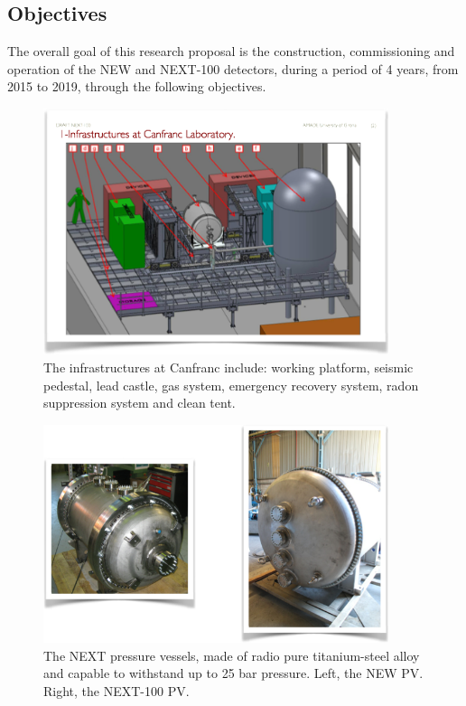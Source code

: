 \subsection*{Objectives}


The overall goal of this research proposal is the construction, commissioning and operation of the NEW and NEXT-100 detectors, during a period of 4 years, from 2015 to 2019, through the following objectives.  

\begin{figure}
\centering
\includegraphics[width=0.9\textwidth]{img/InfraStructures.png}
\caption{\small The infrastructures at Canfranc include: working platform, seismic pedestal, lead castle, gas system, emergency recovery system, radon suppression system and clean tent.}\label{fig.INFRA}
\end{figure}

\begin{figure}
\centering
\includegraphics[width=0.9\textwidth]{img/PV.png}
\caption{\small The NEXT pressure vessels, made of radio pure titanium-steel alloy and capable to withstand up to 25 bar pressure. Left, the NEW PV. Right, the NEXT-100 PV.}\label{fig.PV}
\end{figure}

